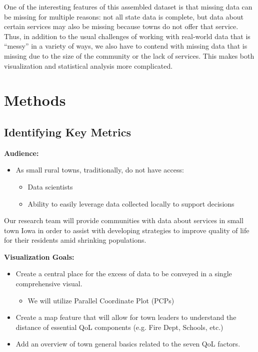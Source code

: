 \documentclass[letterpaper,inpress]{jdsart}
\begin{document}
One of the interesting features of this assembled dataset is that missing data can be missing for multiple reasons: not all state data is complete, but data about certain services may also be missing because towns do not offer that service.
Thus, in addition to the usual challenges of working with real-world data that is ``messy'' in a variety of ways, we also have to contend with missing data that is missing due to the size of the community or the lack of services. This makes both visualization and statistical analysis more complicated.

\hypertarget{methods}{%
\section{Methods}\label{methods}}

\subsection{Identifying Key Metrics}

\textbf{Audience:}

\begin{itemize}
\item As small rural towns, traditionally, do not have access:
\begin{itemize}
     \item Data scientists 
      \item Ability to easily leverage data collected locally to support decisions 
\end{itemize}
\end{itemize}

Our research team will provide communities with data about services in small town Iowa in order to assist with developing strategies to improve quality of life for their residents amid shrinking populations.

\textbf{Visualization Goals:}

\begin{itemize}
\item Create a central place for the excess of data to be conveyed in a single comprehensive visual.
  \begin{itemize}
    \item We will utilize Parallel Coordinate Plot (PCPs)
    \end{itemize}
\item Create a map feature that will allow for town leaders to understand the distance of essential QoL components (e.g. Fire Dept, Schools, etc.)
\item Add an overview of town general basics related to the seven QoL factors.
\end{itemize}
\end{document}
